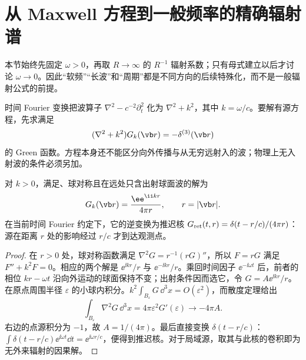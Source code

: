 \section{从 Maxwell 方程到一般频率的精确辐射谱}

本节始终先固定 \(\omega>0\)，再取 \(R\to\infty\) 的 \(R^{-1}\) 辐射系数；只有母式建立以后才讨论 \(\omega\to0\)。因此“软频”“长波”和“周期”都是不同方向的后续特殊化，而不是一般辐射公式的前提。

时间 Fourier 变换把波算子 \(\nabla^2-c^{-2}\partial_t^2\) 化为 \(\nabla^2+k^2\)，其中 \(k=\omega/c\)。要解有源方程，先求满足
\begin{equation}
 (\nabla^2+k^2)G_k(\vb r)=-\delta^{(3)}(\vb r)
 \label{eq:phys-rr-helmholtz-green-definition}
\end{equation}
的 Green 函数。方程本身还不能区分向外传播与从无穷远射入的波；物理上无入射波的条件必须另加。

\begin{proposition}
对 \(k>0\)，满足、球对称且在远处只含出射球面波的解为
\begin{equation}
 G_k(\vb r)=\frac{\ee^{\ii k r}}{4\pi r},
 \qquad r=|\vb r|.
 \label{eq:phys-rr-helmholtz-green}
\end{equation}
在当前时间 Fourier 约定下，它的逆变换为推迟核
\(G_{\rm ret}(t,r)=\delta(t-r/c)/(4\pi r)\)：源在距离 \(r\) 处的影响经过 \(r/c\) 才到达观测点。
\end{proposition}

\begin{proof}
在 \(r>0\) 处，球对称函数满足
\(\nabla^2G=r^{-1}(rG)''\)，所以 \(F=rG\) 满足
\(F''+k^2F=0\)。相应的两个解是 \(\ee^{\ii kr}/r\) 与
\(\ee^{-\ii kr}/r\)。乘回时间因子 \(\ee^{-\ii\omega t}\) 后，前者的相位 \(kr-\omega t\) 沿向外运动的球面保持不变；出射条件因而选它，令 \(G=A\ee^{\ii kr}/r\)。在原点周围半径 \(\varepsilon\) 的小球内积分。\(k^2\int_{B_\varepsilon}G\,\dd^3x=O(\varepsilon^2)\)，而散度定理给出
\[
 \int_{B_\varepsilon}\nabla^2G\,\dd^3x
 =4\pi\varepsilon^2G'(\varepsilon)
 \longrightarrow-4\pi A.
\]
右边的点源积分为 \(-1\)，故 \(A=1/(4\pi)\)。最后直接变换
\(\delta(t-r/c)\)：\(\int\delta(t-r/c)\ee^{\ii\omega t}\dd t=\ee^{\ii\omega r/c}\)，便得到推迟核。对于局域源，取其与此核的卷积即为无外来辐射的因果解。
\end{proof}

